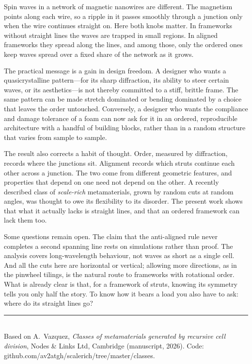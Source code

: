 \documentclass[11pt,twocolumn]{article}
\newcommand{\sect}[1]{\par\needspace{5\baselineskip}\medskip{\sffamily\bfseries\color{accent}\MakeUppercase{#1}}\par\smallskip\noindent}
\begin{document}
Spin waves in a network of magnetic nanowires are different. The magnetism points along each wire, so a ripple in it passes smoothly through a junction only when the wire continues straight on. Here both knobs matter. In frameworks without straight lines the waves are trapped in small regions. In aligned frameworks they spread along the lines, and among those, only the ordered ones keep waves spread over a fixed share of the network as it grows.

\sect{Why should we care?}
The practical message is a gain in design freedom. A designer who wants a quasicrystalline pattern---for its sharp diffraction, its ability to steer certain waves, or its aesthetics---is not thereby committed to a stiff, brittle frame. The same pattern can be made stretch dominated or bending dominated by a choice that leaves the order untouched. Conversely, a designer who wants the compliance and damage tolerance of a foam can now ask for it in an ordered, reproducible architecture with a handful of building blocks, rather than in a random structure that varies from sample to sample.

The result also corrects a habit of thought. Order, measured by diffraction, records where the junctions sit. Alignment records which struts continue each other across a junction. The two come from different geometric features, and properties that depend on one need not depend on the other. A recently described class of \emph{scale-rich} metamaterials, grown by random cuts at random angles, was thought to owe its flexibility to its disorder. The present work shows that what it actually lacks is straight lines, and that an ordered framework can lack them too.

Some questions remain open. The claim that the anti-aligned rule never completes a second spanning line rests on simulations rather than proof. The analysis covers long-wavelength behaviour, not waves as short as a single cell. And all the cuts here are horizontal or vertical; allowing more directions, as in the pinwheel tilings, is the natural route to frameworks with rotational order. What is already clear is that, for a framework of struts, knowing its symmetry tells you only half the story. To know how it bears a load you also have to ask: where do its straight lines go?

\medskip
\noindent\rule{\linewidth}{0.4pt}\\
{\footnotesize\sffamily Based on A.\ Vazquez, \emph{Classes of metamaterials generated by recursive cell division}, Nodes \& Links Ltd, Cambridge (manuscript, 2026). Code: github.com/av2atgh/scalerich/tree/master/classes.}
\end{document}
